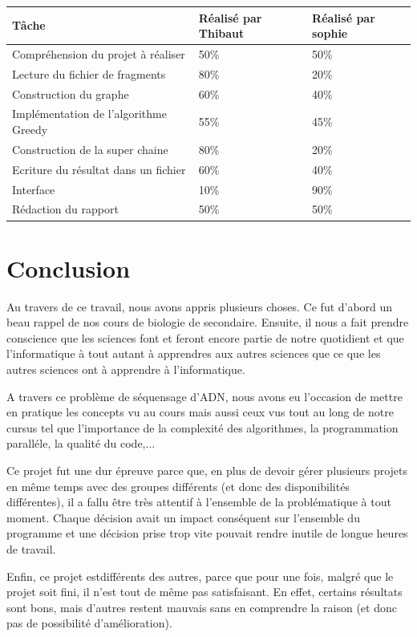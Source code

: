 \documentclass[12pt,a4paper,final]{article}
\begin{document}
\begin{table}[!ht]
\centering
\begin{tabular}{|l|l|l|}
	\hline
	Tâche & Réalisé par Thibaut & Réalisé par sophie\\
	\hline
	Compréhension du projet à réaliser & 50\% & 50\% \\
	Lecture du fichier de fragments & 80\% & 20\% \\
	Construction du graphe & 60\% & 40\% \\
	Implémentation de l'algorithme Greedy & 55\% & 45\% \\
	Construction de la super chaine & 80\% & 20\% \\
	Ecriture du résultat dans un fichier & 60\% & 40\% \\
	Interface & 10\% & 90\% \\
	Rédaction du rapport  & 50\% & 50\% \\ %
\end{tabular}
\end{table}

\newpage
\section{Conclusion} 
Au travers de ce travail, nous avons appris plusieurs choses. Ce fut d'abord un beau rappel de nos cours de biologie de secondaire. Ensuite, il nous a fait prendre conscience que les sciences font et feront encore partie de notre quotidient et que l'informatique à tout autant à apprendres aux autres sciences que ce que les autres sciences ont à apprendre à l'informatique.

A travers ce problème de séquensage d'ADN, nous avons eu l'occasion de mettre en pratique les concepts vu au cours mais aussi ceux vus tout au long de notre cursus tel que l'importance de la complexité des algorithmes, la programmation paralléle, la qualité du code,...

Ce projet fut une dur épreuve parce que, en plus de devoir gérer plusieurs projets en même temps avec des groupes différents (et donc des disponibilités différentes), il a fallu être très attentif à l'ensemble de la problématique à tout moment. Chaque décision avait un impact conséquent sur l'ensemble du programme et une décision prise trop vite pouvait rendre inutile de longue heures de travail.

Enfin, ce projet estdifférents des autres, parce que pour une fois, malgré que le projet soit fini, il n'est tout de même pas satisfaisant. En effet, certains résultats sont bons, mais d'autres restent mauvais sans en comprendre la raison (et donc pas de possibilité d'amélioration).
\end{document}
